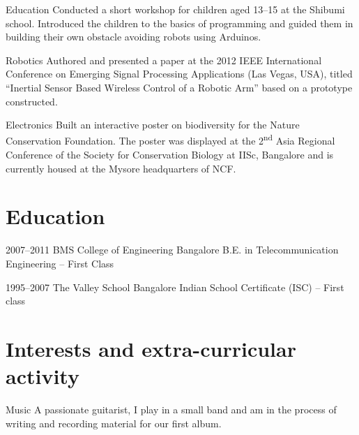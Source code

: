 \documentclass[11pt,a4paper,sans]{moderncv}        %
\begin{document}
\vspace{6pt}

\cvline
{\textcolor{light}{Education}}
{Conducted a short workshop for children aged 13--15 at the Shibumi school. Introduced the children to the basics of programming and guided them in building their own obstacle avoiding robots using Arduinos.}

\vspace{6pt}

\cvline
{\textcolor{light}{Robotics}}
{Authored and presented a paper at the 2012 IEEE International Conference on Emerging Signal Processing Applications (Las Vegas, USA), titled ``Inertial Sensor Based Wireless Control of a Robotic Arm'' based on a prototype constructed.}

\vspace{6pt}

\cvline
{\textcolor{light}{Electronics}}
{Built an interactive poster on biodiversity for the Nature Conservation Foundation. The poster was displayed at the 2\textsuperscript{nd} Asia Regional Conference of the Society for Conservation Biology at IISc, Bangalore and is currently housed at the Mysore headquarters of NCF.}

\vspace{6pt}


\section{Education}

\vspace{6pt}

\cventry
{\textcolor{light}{2007--2011}}
{BMS College of Engineering}
{Bangalore}
{}
{}
{B.E. in Telecommunication Engineering -- First Class}

\vspace{6pt}

\cventry
{\textcolor{light}{1995--2007}}
{The Valley School}
{Bangalore}
{}
{}
{Indian School Certificate (ISC) -- First class}

\vspace{6pt}

\section{Interests and extra-curricular activity}

\vspace{6pt}

\cvline
{\textcolor{light}{Music}}
{A passionate guitarist, I play in a small band and am in the process of writing and recording material for our first album.}
\end{document}
